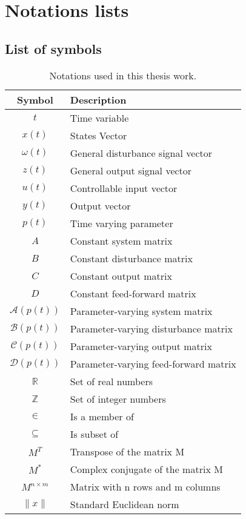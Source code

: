\chapter*{Notations lists}

\section*{List of symbols}

\begin{table}[ht]
	\centering
	\begin{tabular}[t]{c l} %
		\toprule
			Symbol				&	Description							\\
		\midrule
			$t$ 				& 	Time variable 						\\
			$x(t)$ 				& 	States Vector						\\
			$\omega(t)$ 		& 	General disturbance	signal vector	\\
			$z(t)$ 				& 	General output signal vector		\\
			$u(t)$ 				& 	Controllable input vector	 		\\			
			$y(t)$				& 	Output vector						\\
			$p(t)$ 				& 	Time varying parameter				\\
			$A$					& 	Constant system matrix 					\\
			$B$	 				& 	Constant disturbance matrix 			\\
			$C$	 				& 	Constant output matrix 					\\
			$D$					&	Constant feed-forward matrix			\\
			$\mathcal{A}(p(t))$	& 	Parameter-varying system matrix 		\\
			$\mathcal{B}(p(t))$	& 	Parameter-varying disturbance matrix	\\
			$\mathcal{C}(p(t))$	& 	Parameter-varying output matrix 		\\
			$\mathcal{D}(p(t))$	& 	Parameter-varying feed-forward matrix 	\\
			$\mathbb{R}$		&	Set of real numbers					\\
			$\mathbb{Z}$		&	Set of integer numbers				\\
			$\in$				&	Is a member of						\\
			$\subseteq$			&	Is subset of						\\
			$M^T$				&	Transpose of the matrix M			\\
			$M^*$				&	Complex conjugate of the matrix M	\\
			$M^{n \times m}$	&	Matrix with n rows and m columns	\\
			$\|x\|$				&	Standard Euclidean norm				\\
		\bottomrule
	\end{tabular}
	\caption{Notations used in this thesis work.}
\end{table}

